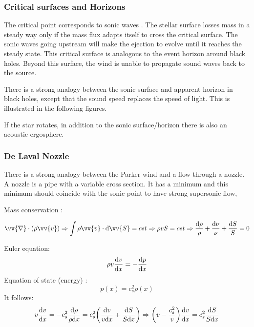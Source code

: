 \documentclass[10pt,a4paper,english]{article}
\let\originalleft\left
\let\originalright\right
\renewcommand{\left}{\mathopen{}\mathclose\bgroup\originalleft}
\renewcommand{\right}{\aftergroup\egroup\originalright}
\begin{document}
\subsubsection{Critical surfaces and Horizons}

The critical point corresponds to sonic waves . The stellar surface losses mass in a steady
way only if the mass flux  adapts itself to cross the critical surface. The sonic waves going
upstream will make the ejection to evolve until it reaches the steady state. This critical surface
is analogous to the event horizon around black holes. Beyond this surface, the wind is unable
to propagate sound waves back to the source.

There is a strong analogy between the sonic surface and apparent horizon in black holes,
except that the sound speed  replaces the speed of light. This is illustrated in the following
figures.


If the star rotates, in addition to the sonic surface/horizon there is also an acoustic ergosphere.


\subsubsection{De Laval Nozzle}

There is a strong analogy between the Parker wind and a flow through a nozzle. A nozzle is a
pipe with a variable cross section. It has a minimum and this minimum should coincide with the
sonic point to have strong supersonic flow,


Mass conservation :

\begin{equation}
    \vv{\nabla}\cdot(\rho\vv{v}) \Rightarrow \int \rho\vv{v}\cdot \d \vv{S} = cst \Rightarrow \rho vS = cst
    \Rightarrow \frac{\d \rho}{\rho} + \frac{\d \nu}{\nu} + \frac{\d S}{S} = 0
\end{equation}

Euler equation:
\begin{equation}
    \rho v \frac{\mathrm{d} v}{\mathrm{d} x} = -\frac{\mathrm{d} p}{\mathrm{d} x}
\end{equation}
Equation of state (energy) :
\begin{equation}
    p(x) = c_{s}^2\rho(x)
\end{equation}
It follows:
\begin{equation}
    v\frac{\d v}{\d x} = -c_s^2\frac{\d\rho}{\rho \d x} = c_s^2\left(\frac{\d v}{v\d x}+\frac{\d S}{S\d x}\right)
    \Rightarrow \left( v - \frac{c_s^2}{v} \right)\frac{\d v}{\d x} = c_s^2\frac{\d S}{S \d x}
\end{equation}
\end{document}
